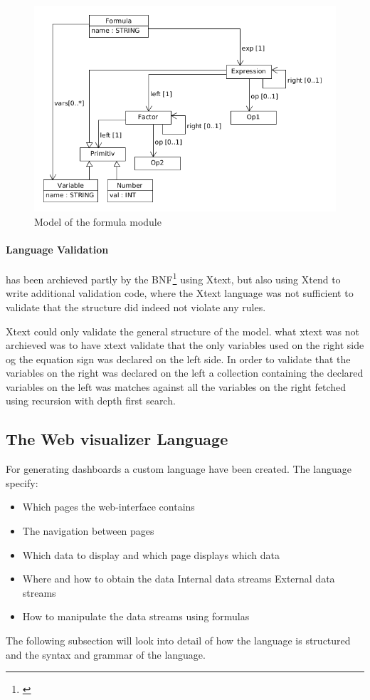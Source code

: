 \begin{figure}
  \begin{center}
  \includegraphics[width=\linewidth]{images/MetaFormula}
  \end{center}
  \caption{Model of the formula module}
  \label{fig:formulaModel}
\end{figure}
\paragraph{Language Validation}
has been archieved partly by the BNF\footnote{\cite{BNF}} using Xtext, but also
using Xtend to write additional validation code, where the Xtext language was not sufficient
to validate that the structure did indeed not violate any rules.

Xtext could only validate the general structure of the model.
what xtext was not archieved was to have xtext validate that the only variables used
on the right side og the equation sign was declared on the left side.
In order to validate that the variables on the right was declared on the left a
collection containing the declared variables on the left was matches against all the variables
on the right fetched using recursion with depth first search.

\subsection{The Web visualizer Language}
For generating dashboards a custom language have been created.
The language specify:
\begin{itemize}
\item Which pages the web-interface contains
\item The navigation between pages
\item Which data to display and which page displays which data
\item Where and how to obtain the data
\subitem Internal data streams
\subitem External data streams
\item How to manipulate the data streams using formulas
\end{itemize}
The following subsection will look into detail of how the language is structured and the
syntax and grammar of the language.

